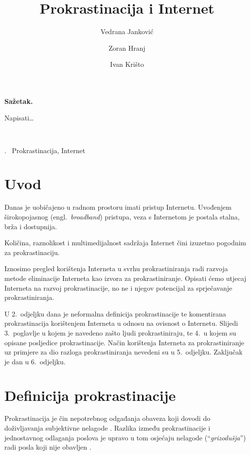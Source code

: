 \documentclass[11pt,twocolumn,english]{article}
\let\LaTeXtitle\title
\renewcommand{\title}[1]{\LaTeXtitle{\Large \textbf{#1}}}
\renewenvironment{abstract}
{\noindent \large \bf Sažetak.\normalsize\begin{it}}
{\end{it}\\}
\newenvironment{keywords}
{\noindent {\large {\bf Ključne riječi}}.~}{}
\newcommand{\engl}[1]{(engl.~\emph{#1})}
\begin{document}
\title{Prokrastinacija i Internet}
\author{Vedrana Janković}
\author{Zoran Hranj}
\author{Ivan Krišto}

\date{}

\maketitle
\thispagestyle{empty}
\pagestyle{empty}

\begin{abstract}
Napisati\ldots
\end{abstract}

\begin{keywords}
Prokrastinacija, Internet
\end{keywords}


\section{Uvod}
Danas je uobičajeno u radnom prostoru imati pristup Internetu. Uvođenjem
širokopojasnog \engl{broadband} pristupa, veza s Internetom je postala stalna,
brža i dostupnija.

Količina, raznolikost i multimedijalnost sadržaja Internet čini izuzetno
pogodnim za prokrastinaciju.

Iznosimo pregled korištenja Interneta u svrhu prokrastiniranja radi razvoja
metode eliminacije Interneta kao izvora za prokrastiniranje. Opisati ćemo
utjecaj Interneta na razvoj prokrastinacije, no ne i njegov potencijal za
sprječavanje prokrastiniranja.

U 2.~odjeljku dana je neformalna definicija prokrastinacije te komentirana
prokrastinacija korištenjem Interneta u odnosu na ovisnost o Internetu. Slijedi
3.~poglavlje u kojem je navedeno zašto ljudi prokrastiniraju, te 4.~u kojem su
opisane posljedice prokrastinacije. Način korištenja Interneta za
prokrastiniranje uz primjere za dio razloga prokrastiniranja nevedeni su u
5.~odjeljku. Zaključak je dan u 6.~odjeljku.


\section{Definicija prokrastinacije}
Prokrastinacija je čin nepotrebnog odgađanja obaveza koji dovodi do 
doživljavanja subjektivne nelagode \cite{solomon1984academic}. Razlika između
prokrastinacije i jednostavnog odlaganja poslova je upravo u tom osjećaju
nelagode (``\emph{grizodušja}'') radi posla koji nije obavljen
\cite{burka2004procrastination}.
\end{document}
